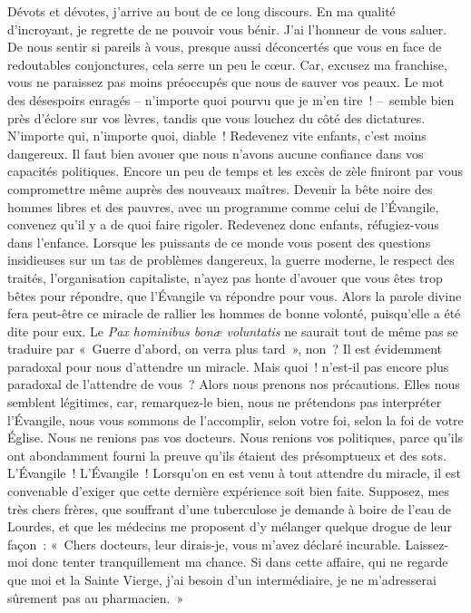 \documentclass[french,twoside]{book} %
\begin{document}
Dévots et dévotes, j’arrive au bout de ce long discours. En ma qualité d’incroyant, je regrette de ne pouvoir vous bénir. J’ai l’honneur de vous saluer. De nous sentir si pareils à vous, presque aussi déconcertés que vous en face de redoutables conjonctures, cela serre un peu le cœur. Car, excusez ma franchise, vous ne paraissez pas moins préoccupés que nous de sauver vos peaux. Le mot des désespoirs enragés – n’importe quoi pourvu que je m’en tire ! – semble bien près d’éclore sur vos lèvres, tandis que vous louchez du côté des dictatures. N’importe qui, n’importe quoi, diable ! Redevenez vite enfants, c’est moins dangereux. Il faut bien avouer que nous n’avons aucune confiance dans vos capacités politiques. Encore un peu de temps et les excès de zèle finiront par vous compromettre même auprès des nouveaux maîtres. Devenir la bête noire des hommes libres et des pauvres, avec un programme comme celui de l’Évangile, convenez qu’il y a de quoi faire rigoler. Redevenez donc enfants, réfugiez-vous dans l’enfance. Lorsque les puissants de ce monde vous posent des questions insidieuses sur un tas de problèmes dangereux, la guerre moderne, le respect des traités, l’organisation capitaliste, n’ayez pas honte d’avouer que vous êtes trop bêtes pour répondre, que l’Évangile va répondre pour vous. Alors la parole divine fera peut-être ce miracle de rallier les hommes de bonne volonté, puisqu’elle a été dite pour eux. Le \emph{Pax hominibus bonæ voluntatis} ne saurait tout de même pas se traduire par « Guerre d’abord, on verra plus tard », non ? Il est évidemment paradoxal pour nous d’attendre un miracle. Mais quoi ! n’est-il pas encore plus paradoxal de l’attendre de vous ? Alors nous prenons nos précautions. Elles nous semblent légitimes, car, remarquez-le bien, nous ne prétendons pas interpréter l’Évangile, nous vous sommons de l’accomplir, selon votre foi, selon la foi de votre Église. Nous ne renions pas vos docteurs. Nous renions vos politiques, parce qu’ils ont abondamment fourni la preuve qu’ils étaient des présomptueux et des sots. L’Évangile ! L’Évangile ! Lorsqu’on en est venu à tout attendre du miracle, il est convenable d’exiger que cette dernière expérience soit bien faite. Supposez, mes très chers frères, que souffrant d’une tuberculose je demande à boire de l’eau de Lourdes, et que les médecins me proposent d’y mélanger quelque drogue de leur façon : « Chers docteurs, leur dirais-je, vous m’avez déclaré incurable. Laissez-moi donc tenter tranquillement ma chance. Si dans cette affaire, qui ne regarde que moi et la Sainte Vierge, j’ai besoin d’un intermédiaire, je ne m’adresserai sûrement pas au pharmacien. »
\end{document}
